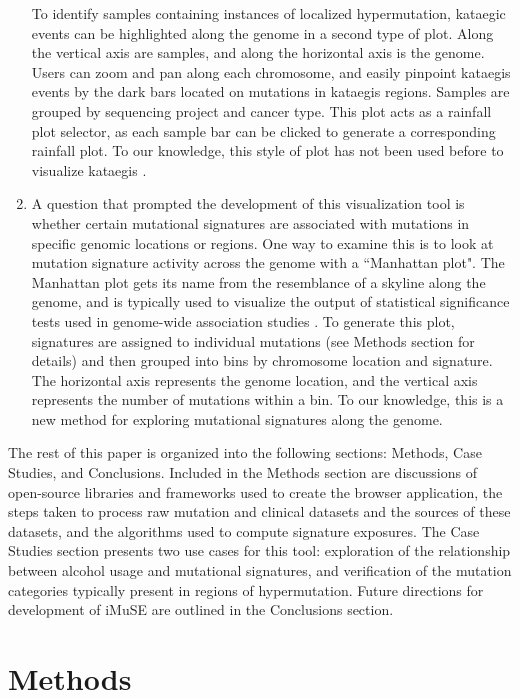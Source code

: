 \documentclass[12pt, letterpaper]{article}
\begin{document}
\begin{enumerate}
To identify samples containing instances of localized hypermutation, kataegic events can be highlighted along the genome in a second type of plot.
Along the vertical axis are samples, and along the horizontal axis is the genome.
Users can zoom and pan along each chromosome, and easily pinpoint kataegis events by the dark bars located on mutations in kataegis regions.
Samples are grouped by sequencing project and cancer type.
This plot acts as a rainfall plot selector, as each sample bar can be clicked to generate a corresponding rainfall plot.
To our knowledge, this style of plot has not been used before to visualize kataegis .
    
\item A question that prompted the development of this visualization tool is whether certain mutational signatures are associated with mutations in specific genomic locations or regions.
One way to examine this is to look at mutation signature activity across the genome with a ``Manhattan plot".
The Manhattan plot gets its name from the resemblance of a skyline along the genome, and is typically used to visualize the output of statistical significance tests used in genome-wide association studies \citep{gibson2010hints}.
To generate this plot, signatures are assigned to individual mutations (see Methods section for details) and then grouped into bins by chromosome location and signature.
The horizontal axis represents the genome location, and the vertical axis represents the number of mutations within a bin.
To our knowledge, this is a new method for exploring mutational signatures along the genome.

\end{enumerate}

The rest of this paper is organized into the following sections: Methods, Case Studies, and Conclusions. Included in the Methods section are discussions of open-source libraries and frameworks used to create the browser application, the steps taken to process raw mutation and clinical datasets and the sources of these datasets, and the algorithms used to compute signature exposures. The Case Studies section presents two use cases for this tool: exploration of the relationship between alcohol usage and mutational signatures, and verification of the mutation categories typically present in regions of hypermutation. Future directions for development of iMuSE are outlined in the Conclusions section.


\section{Methods}
\end{document}
